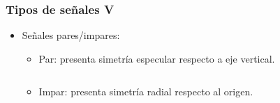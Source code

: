 \begin{frame}
  \frametitle{Tipos de señales V}
  \vspace{-0.2cm}
  \begin{itemize}
    \item <1-> Señales pares/impares:
    \begin{itemize}
      \vspace{0.1cm}
      \item \alert{Par}: presenta simetría especular respecto a eje vertical.
      \vspace{0.1cm}
      \begin{itemize}
        \begin{columns}[c]
          \hspace{1cm}
          \hspace{-1.5cm}
      \end{columns}
    \end{itemize}
    \vspace{0.1cm}
    \item \alert{Impar}: presenta simetría radial respecto al origen.
    \vspace{0.1cm}
    \begin{itemize}
      \begin{columns}[c]
        \hspace{1cm}
        \hspace{-1.5cm}
      \end{columns}
    \end{itemize}
    \vspace{0.1cm}
    \vspace{0.1cm}

\end{itemize}
\end{itemize}
\end{frame}
